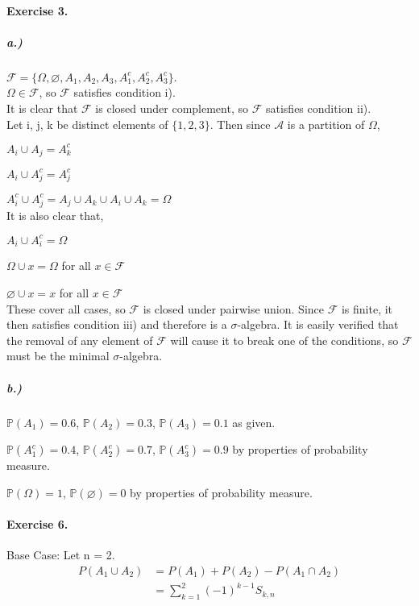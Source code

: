 \documentclass{article}
\begin{document}
	\paragraph{Exercise 3.}
	\subparagraph{a.)}
		$\mathcal{F}=\{\Omega, \varnothing, A_1, A_2, A_3, A_1^c, A_2^c, A_3^c\}$.\\
	
		\noindent$\Omega\in\mathcal{F}$, so $\mathcal{F}$ satisfies condition i).\\
		
		\noindent It is clear that $\mathcal{F}$ is closed under complement, so $\mathcal{F}$ satisfies condition ii).\\
		
		\noindent Let i, j, k be distinct elements of $\{1, 2, 3\}$. Then since $\mathcal{A}$ is a partition of $\Omega$,
		
		\noindent$A_i\cup A_j=A_k^c$
		
		\noindent$A_i\cup A_j^c=A_j^c$
		
		\noindent$A_i^c\cup A_j^c=A_j\cup A_k\cup A_i\cup A_k=\Omega$\\
		
		\noindent It is also clear that,
		
		\noindent$A_i\cup A_i^c=\Omega$
		
		\noindent$\Omega\cup x=\Omega$ for all $x\in \mathcal{F}$
		
		\noindent$\varnothing\cup x=x$ for all $x\in \mathcal{F}$\\
		
		These cover all cases, so $\mathcal{F}$ is closed under pairwise union. Since $\mathcal{F}$ is finite, it then satisfies condition iii) and therefore is a $\sigma$-algebra. It is easily verified that the removal of any element of $\mathcal{F}$ will cause it to break one of the conditions, so $\mathcal{F}$ must be the minimal $\sigma$-algebra.
	
	\subparagraph{b.)}
		$\mathbb{P}(A_1)=0.6$, $\mathbb{P}(A_2)=0.3$, $\mathbb{P}(A_3)=0.1$ as given.
		
		$\mathbb{P}(A_1^c)=0.4$, $\mathbb{P}(A_2^c)=0.7$, $\mathbb{P}(A_3^c)=0.9$ by properties of probability measure.
		
		$\mathbb{P}(\Omega)=1$, $\mathbb{P}(\varnothing)=0$ by properties of probability measure.

	\paragraph{Exercise 6.}
	Base Case: Let n = 2.
	\begin{align*}
		P(A_1\cup A_2)&=P(A_1)+P(A_2)-P(A_1\cap A_2)\\
		&=\sum_{k=1}^{2}(-1)^{k-1}S_{k,n}
	\end{align*}
	
\end{document}
